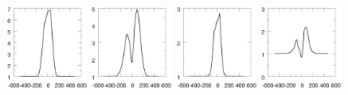 \documentclass{article}
\begin{document}
\begin{figure}
	\centering
    \includegraphics[width=0.24\textwidth]{profHa3wind06090}
    \includegraphics[width=0.24\textwidth]{profHa3wind03060}
    \includegraphics[width=0.24\textwidth]{profHb3wind06090}    
    \includegraphics[width=0.24\textwidth]{profHb3wind03060}
    

\end{figure}
\end{document}
